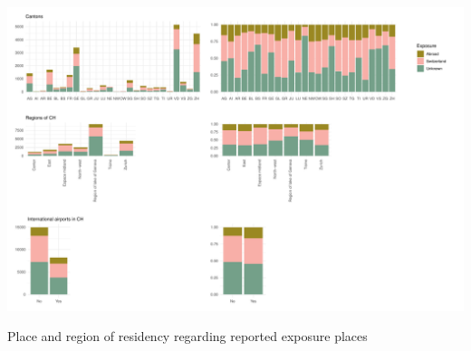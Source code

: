 \documentclass[10pt, a4paper, twoside]{article}
\begin{document}
\clearpage
\begin{suppfigure}[h]
\centering
\includegraphics[scale=0.4]{SF4_2021-04-20.pdf}
\caption{Place and region of residency regarding reported exposure places}
\label{sf4}
\end{suppfigure}
\end{document}
